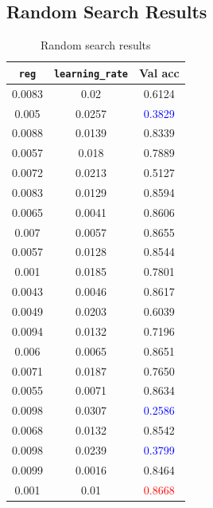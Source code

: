 \documentclass[10pt,a4paper,twoside]{tau}
\begin{document}
\subsection{Random Search Results}
\begin{table}[h]
    \centering
    \begin{tabular}{|c|c|c|}
        \hline
        \texttt{reg} & \texttt{learning\_rate} & Val acc\\ \hline
        0.0083 & 0.02 & 0.6124 \\ \hline
        0.005 & 0.0257  & \textcolor{blue}{0.3829} \\ \hline
        0.0088 & 0.0139   & 0.8339 \\ \hline
        0.0057  & 0.018 & 0.7889 \\ \hline
        0.0072  & 0.0213  & 0.5127 \\ \hline
        0.0083  & 0.0129   & 0.8594 \\ \hline
        0.0065   & 0.0041 & 0.8606 \\ \hline
        0.007   & 0.0057  & 0.8655 \\ \hline
        0.0057   & 0.0128   & 0.8544 \\ \hline
        0.001 & 0.0185 & 0.7801 \\ \hline
        0.0043 & 0.0046  & 0.8617 \\ \hline
        0.0049 & 0.0203   & 0.6039 \\ \hline
        0.0094  & 0.0132 & 0.7196 \\ \hline
        0.006  & 0.0065  & 0.8651 \\ \hline
        0.0071  & 0.0187   & 0.7650 \\ \hline
        0.0055   & 0.0071 & 0.8634 \\ \hline
        0.0098   & 0.0307  & \textcolor{blue}{0.2586} \\ \hline
        0.0068   & 0.0132   & 0.8542 \\ \hline
        0.0098 & 0.0239 & \textcolor{blue}{0.3799} \\ \hline
        0.0099 & 0.0016  & 0.8464 \\ \hline
        0.001 & 0.01   & \textcolor{red}{0.8668} \\ \hline
    \end{tabular}
    \caption{Random search results}
    \label{tab:random-search-results}
\end{table}
					
\end{document}
